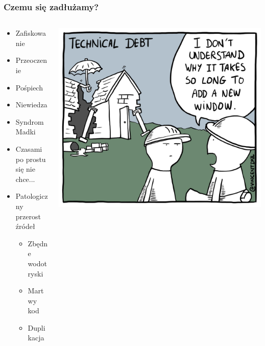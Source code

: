 \documentclass[xcolor=dvipsnames]{beamer}%
\begin{document}
\begin{frame}
	\frametitle{Czemu się zadłużamy?}
	\begin{columns}
		\begin{column}{0.5\textwidth}
			\begin{itemize}
				\item Zafiskowanie
				\item Przeoczenie
				\item Pośpiech
				\item Niewiedza
				\item Syndrom Madki
				\item Czasami po prostu się nie chce...
				\item Patologiczny przerost źródeł
				      \begin{itemize}
					      \item Zbędne wodotryski
					      \item Martwy kod
					      \item Duplikacja
				      \end{itemize}
			\end{itemize}
		\end{column}
		\begin{column}{0.5\textwidth}
			\includegraphics[width=\textwidth,height=\textheight,keepaspectratio]{figure/dlug_techniczny.jpg}
		\end{column}
	\end{columns}
\end{frame}
\end{document}
